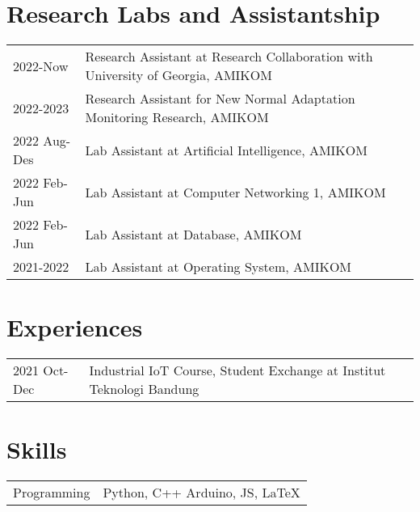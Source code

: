 \documentclass[12pt,letterpaper]{report}
\begin{document}
    \section*{Research Labs and Assistantship}

    \begin{tabular}{@{}p{}p{}}
        2022-Now & Research Assistant at Research Collaboration with University of Georgia, AMIKOM \\
        2022-2023 & Research Assistant for New Normal Adaptation Monitoring Research, AMIKOM \\
        2022 Aug-Des & Lab Assistant at Artificial Intelligence, AMIKOM \\
        2022 Feb-Jun & Lab Assistant at Computer Networking 1, AMIKOM \\
        2022 Feb-Jun & Lab Assistant at Database, AMIKOM \\
        2021-2022 & Lab Assistant at Operating System, AMIKOM \\
    \end{tabular}



    \section*{Experiences}
    \begin{tabular}{@{}p{}p{}}
        2021 Oct-Dec & Industrial IoT Course, Student Exchange at Institut Teknologi Bandung
    \end{tabular}

    \section*{Skills}
    \begin{tabular}{@{}p{}p{}}
        Programming & Python, C++ Arduino, JS, \LaTeX \\
    \end{tabular}
\end{document}
